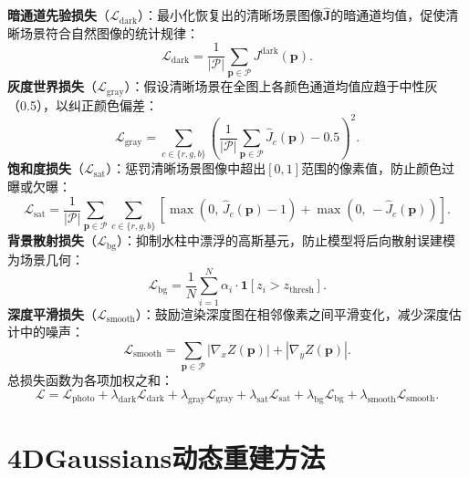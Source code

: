 \textbf{暗通道先验损失}（$\mathcal{L}_{\mathrm{dark}}$）：最小化恢复出的清晰场景图像$\hat{\mathbf{J}}$的暗通道均值，促使清晰场景符合自然图像的统计规律：
\begin{equation}
    \mathcal{L}_{\mathrm{dark}} = \frac{1}{|\mathcal{P}|}\sum_{\mathbf{p} \in \mathcal{P}} J^{\mathrm{dark}}(\mathbf{p}).
    \label{eq:loss_dark}
\end{equation}\textbf{灰度世界损失}（$\mathcal{L}_{\mathrm{gray}}$）：假设清晰场景在全图上各颜色通道均值应趋于中性灰（0.5），以纠正颜色偏差：
\begin{equation}
    \mathcal{L}_{\mathrm{gray}} = \sum_{c \in \{r,g,b\}} \left(\frac{1}{|\mathcal{P}|}\sum_{\mathbf{p}\in\mathcal{P}} \hat{J}_c(\mathbf{p}) - 0.5\right)^2.
    \label{eq:loss_gray}
\end{equation}\textbf{饱和度损失}（$\mathcal{L}_{\mathrm{sat}}$）：惩罚清晰场景图像中超出$[0,1]$范围的像素值，防止颜色过曝或欠曝：
\begin{equation}
    \mathcal{L}_{\mathrm{sat}} = \frac{1}{|\mathcal{P}|}\sum_{\mathbf{p}\in\mathcal{P}}\sum_{c\in\{r,g,b\}}\left[\max\!\left(0,\, \hat{J}_c(\mathbf{p}) - 1\right) + \max\!\left(0,\, -\hat{J}_c(\mathbf{p})\right)\right].
    \label{eq:loss_sat}
\end{equation}\textbf{背景散射损失}（$\mathcal{L}_{\mathrm{bg}}$）：抑制水柱中漂浮的高斯基元，防止模型将后向散射误建模为场景几何：
\begin{equation}
    \mathcal{L}_{\mathrm{bg}} = \frac{1}{N}\sum_{i=1}^{N} \alpha_i \cdot \mathbf{1}[z_i > z_{\mathrm{thresh}}].
    \label{eq:loss_bg}
\end{equation}\textbf{深度平滑损失}（$\mathcal{L}_{\mathrm{smooth}}$）：鼓励渲染深度图在相邻像素之间平滑变化，减少深度估计中的噪声：
\begin{equation}
    \mathcal{L}_{\mathrm{smooth}} = \sum_{\mathbf{p}\in\mathcal{P}} \left|\nabla_x Z(\mathbf{p})\right| + \left|\nabla_y Z(\mathbf{p})\right|.
    \label{eq:loss_smooth}
\end{equation}总损失函数为各项加权之和：
\begin{equation}
    \mathcal{L} = \mathcal{L}_{\mathrm{photo}} + \lambda_{\mathrm{dark}} \mathcal{L}_{\mathrm{dark}} + \lambda_{\mathrm{gray}} \mathcal{L}_{\mathrm{gray}} + \lambda_{\mathrm{sat}} \mathcal{L}_{\mathrm{sat}} + \lambda_{\mathrm{bg}} \mathcal{L}_{\mathrm{bg}} + \lambda_{\mathrm{smooth}} \mathcal{L}_{\mathrm{smooth}}.
    \label{eq:total_loss_seasplat}
\end{equation}
\section{4DGaussians动态重建方法}

